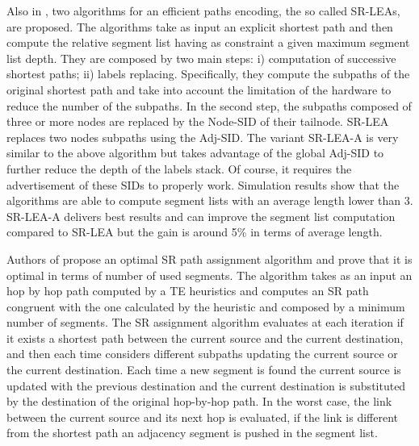 Also in \cite{labelencoding}, two algorithms for an efficient paths encoding, the so called SR-LEAs, are proposed. The algorithms take as input an explicit shortest path and then compute the relative segment list having as constraint a given maximum segment list depth. They are composed by two main steps: i) computation of successive shortest paths; ii) labels replacing. Specifically, they compute the subpaths of the original shortest path and take into account the limitation of the hardware to reduce the number of the subpaths. In the second step, the subpaths composed of three or more nodes are replaced by the Node-SID of their tailnode. SR-LEA replaces two nodes subpaths using the Adj-SID. The variant SR-LEA-A is very similar to the above algorithm but takes advantage of the global Adj-SID to further reduce the depth of the labels stack. Of course, it requires the advertisement of these SIDs to properly work. Simulation results show that the algorithms are able to compute segment lists with an average length lower than 3. SR-LEA-A delivers best results and can improve the segment list computation compared to SR-LEA but the gain is around 5\% in terms of average length.

Authors of \cite{pmsr} propose an optimal SR path assignment algorithm and prove that it is optimal in terms of number of used segments. The algorithm takes as an input an hop by hop path computed by a TE heuristics and computes an SR path congruent with the one calculated by the heuristic and composed by a minimum number of segments. 
The SR assignment algorithm evaluates at each iteration if it exists a shortest path between the current source and the current destination, and then each time considers different subpaths updating the current source or the current destination. 
Each time a new segment is found the current source is updated with the previous destination and the current destination is substituted by the destination of the original hop-by-hop path. In the worst case, the link between the current source and its next hop is evaluated, if the link is different from the shortest path an adjacency segment is pushed in the segment list. 

